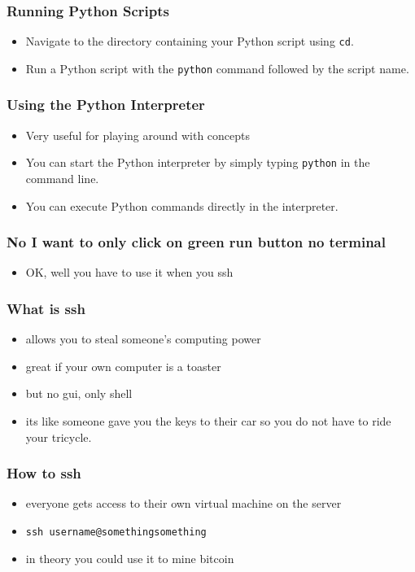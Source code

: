 \documentclass[aspectratio=169,hyperref={unicode}]{beamer}
\begin{document}
\begin{frame}[fragile]
\frametitle{Running Python Scripts}
\begin{itemize}
\item Navigate to the directory containing your Python script using \texttt{cd}.
\item Run a Python script with the \texttt{python} command followed by the script name.
\end{itemize}
\end{frame}

\begin{frame}[fragile]
\frametitle{Using the Python Interpreter}
\begin{itemize}
        \item Very useful for playing around with concepts
\item You can start the Python interpreter by simply typing \texttt{python} in the command line.
\item You can execute Python commands directly in the interpreter.
\end{itemize}
\end{frame}


\begin{frame}
\frametitle{No I want to only click on green run button no terminal}
\begin{itemize}
\item OK, well you have to use it when you ssh
\end{itemize}
\end{frame}

\begin{frame}
\frametitle{What is ssh}
\begin{itemize}
\item allows you to steal someone's computing power
\item great if your own computer is a toaster
\item but no gui, only shell
\item its like someone gave you the keys to their car so you do not have to ride your tricycle.
\end{itemize}
\end{frame}

\begin{frame}
\frametitle{How to ssh}
\begin{itemize}
\item everyone gets access to their own virtual machine on the server
\item \texttt{ssh username@somethingsomething}
\item in theory you could use it to mine bitcoin
\end{itemize}
\end{frame}
\end{document}

